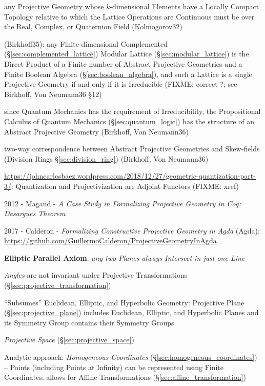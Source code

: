 any Projective Geometry whose $k$-dimensional Elements have a Locally Compact
Topology relative to which the Lattice Operations are Continuous must be over
the Real, Complex, or Quaternion Field (Kolmogorov32)

(Birkhoff35): any Finite-dimensional Complemented
(\S\ref{sec:complemented_lattice}) Modular Lattice (\S\ref{sec:modular_lattice})
is the Direct Product of a Finite number of Abstract Projective Geometries and a
Finite Boolean Algebra (\S\ref{sec:boolean_algebra}), and such a
Lattice is a single Projective Geometry if and only if it is Irreducible
(FIXME: correct ?; see Birkhoff, Von Neumann36 \S 12)

since Quantum Mechanics has the requirement of Irreducibility, the Propositional
Calculus of Quantum Mechanics (\S\ref{sec:quantum_logic}) has the structure of
an Abstract Projective Geometry (Birkhoff, Von Neumann36)

two-way correspondence between Abstract Projective Geometries and Skew-fields
(Division Rings \S\ref{sec:division_ring}) (Birkhoff, Von Neumann36)

\url{https://johncarlosbaez.wordpress.com/2018/12/27/geometric-quantization-part-3/}:
Quantization and Projectivization are Adjoint Functors (FIXME: xref)

2012 - Magaud - \emph{A Case Study in Formalizing Projective Geometry in Coq:
Desargues Theorem}

2017 - Calderon - \emph{Formalizing Constructive Projective Geometry in Agda}
(Agda): \url{https://github.com/GuillermoCalderon/ProjectiveGeometryInAgda}

\textbf{Elliptic Parallel Axiom}: \emph{any two Planes always Intersect in just
  one Line}

\emph{Angles} are not invariant under Projective Transformations
(\S\ref{sec:projective_transformation})

``Subsumes'' Euclidean, Elliptic, and Hyperbolic Geometry: Projective
Plane (\S\ref{sec:projective_plane}) includes Euclidean, Elliptic, and
Hyperbolic Planes and its Symmetry Group contains their Symmetry
Groups

\emph{Projective Space} (\S\ref{sec:projective_space})

Analytic approach: \emph{Homogeneous Coordinates}
(\S\ref{sec:homogeneous_coordinates}) -- Points (including Points at Infinity)
can be represented using Finite Coordinates; allows for Affine Transformations
(\S\ref{sec:affine_transformation}) %

